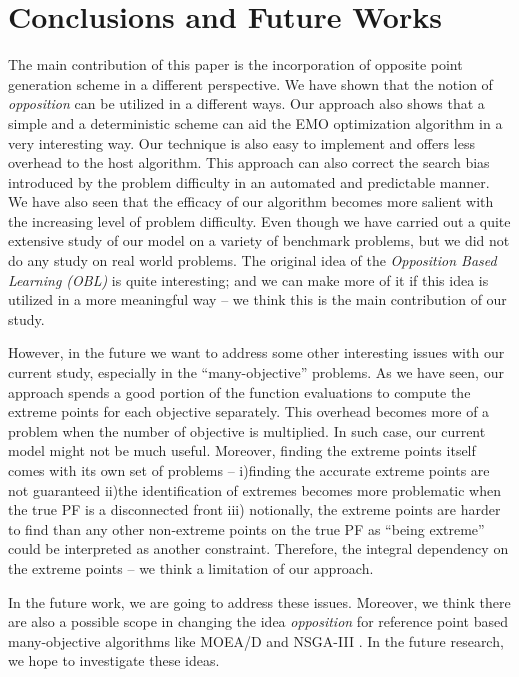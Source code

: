 \documentclass{sig-alternate-05-2015}
\begin{document}
\section{Conclusions and Future Works}
\label{sec:conclusion}
The main contribution of this paper is the incorporation of opposite point generation scheme in a different perspective. We have shown that the notion of \textit{opposition} can be utilized in a different ways. Our approach also shows that a simple and a deterministic scheme can aid the EMO optimization algorithm in a very interesting way. Our technique is also easy to implement and offers less overhead to the host algorithm. This approach can also correct the search bias introduced by the problem difficulty in an automated and predictable manner. We have also seen that the efficacy of our algorithm becomes more salient with the increasing level of problem difficulty. Even though we have carried out a quite extensive study of our model on a variety of benchmark problems, but we did not do any study on real world problems. The original idea of the \textit{Opposition Based Learning (OBL)} is quite interesting; and we can make more of it if this idea is utilized in a more meaningful way -- we think this is the main contribution of our study.  

However, in the future we want to address some other interesting issues with our current study, especially in the ``many-objective'' problems. As we have seen, our approach spends a good portion of the function evaluations to compute the extreme points for each objective separately. This overhead becomes more of a problem when the number of objective is multiplied. In such case, our current model might not be much useful. Moreover, finding the extreme points itself comes with its own set of problems -- i)finding the accurate extreme points are not guaranteed ii)the identification of extremes becomes more problematic when the true PF is a disconnected front iii) notionally, the extreme points are harder to find than any other non-extreme points on the true PF as ``being extreme'' could be interpreted as another constraint. Therefore, the integral dependency on the extreme points -- we think a limitation of our approach.

In the future work, we are going to address these issues. Moreover, we think there are also a possible scope in changing the idea \textit{opposition} for reference point based many-objective algorithms like MOEA/D and NSGA-III \cite{nsga3-main-p1}\cite{nsga3-main-p2}. In the future research, we hope to investigate these ideas.
\end{document}
